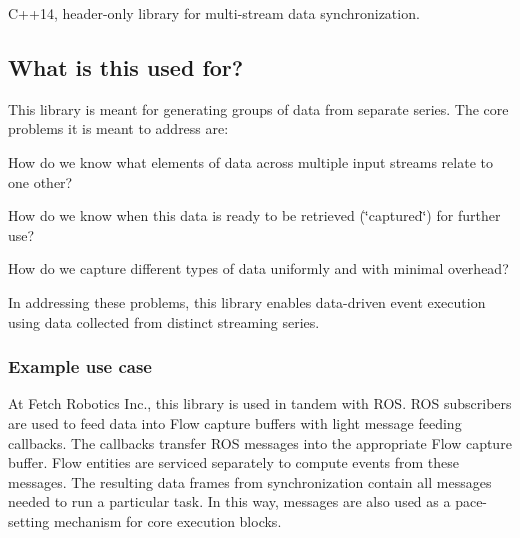 C++14, header-\/only library for multi-\/stream data synchronization.

\subsection*{What is this used for?}

This library is meant for generating groups of data from separate series. The core problems it is meant to address are\+:


\begin{DoxyItemize}
\item How do we know what elements of data across multiple input streams relate to one other?
\item How do we know when this data is ready to be retrieved (\char`\"{}captured\char`\"{}) for further use?
\item How do we capture different types of data uniformly and with minimal overhead?
\end{DoxyItemize}

In addressing these problems, this library enables data-\/driven event execution using data collected from distinct streaming series.

\subsubsection*{Example use case}

At Fetch Robotics Inc., this library is used in tandem with R\+OS. R\+OS subscribers are used to feed data into {\ttfamily Flow} capture buffers with light message feeding callbacks. The callbacks transfer R\+OS messages into the appropriate {\ttfamily Flow} capture buffer. {\ttfamily Flow} entities are serviced separately to compute events from these messages. The resulting data frames from synchronization contain all messages needed to run a particular task. In this way, messages are also used as a pace-\/setting mechanism for core execution blocks. 